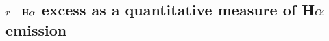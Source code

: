 \documentclass[a4paper,useAMS,usenatbib]{mn2e}
\def\ha{\mbox{H$\rm \alpha$}}
\begin{document}




\subsection{$r - \ha$ excess as a quantitative measure of H$\alpha$ emission}
\end{document}
